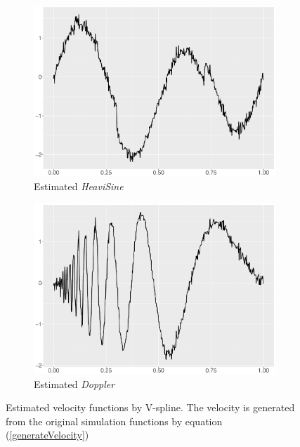 \begin{figure}
\begin{subfigure}{0.45\textwidth}
    \includegraphics[width=\textwidth]{Chapters/02TractorSplineTheory/plot/ggplot/ggHeaviSineTractorVelocity.pdf}
    \caption{Estimated \textit{HeaviSine}  }
    \end{subfigure}
    \begin{subfigure}{0.45\textwidth}
    \centering
    \includegraphics[width=\textwidth]{Chapters/02TractorSplineTheory/plot/ggplot/ggDopplerTractorVelocity.pdf}
    \caption{Estimated \textit{Doppler}  }
    \end{subfigure}
\caption{Estimated velocity functions by V-spline. The velocity is generated from the original simulation functions by equation (\ref{generateVelocity})}\label{numvtractor}
 \end{figure}



